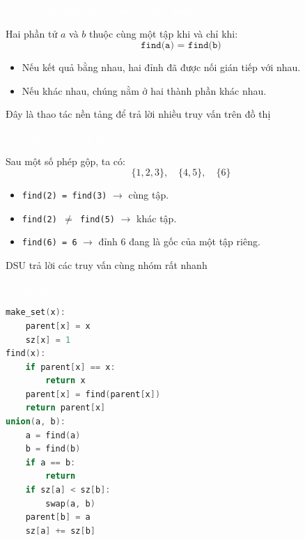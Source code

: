 \documentclass{beamer}
\newcommand{\hlgreen}[1]{\textcolor{mygreen}{#1}}
\newcommand{\hlred}[1]{\textcolor{myred}{#1}}
\newcommand{\hlpurple}[1]{\textcolor{mypurple}{#1}}
\newcommand{\hlorange}[1]{\textcolor{myorange}{#1}}
\newcommand{\hlwhite}[1]{\textcolor{white}{#1}}
\begin{document}

\begin{frame}{\hlwhite{Kiểm tra hai phần tử có cùng tập hay không}}
\begin{tcolorbox}[title=\textbf{\hlgreen{Quy tắc}}]
Hai phần tử \(a\) và \(b\) thuộc cùng một tập khi và chỉ khi:
\[
\texttt{find(a) = find(b)}
\]
\end{tcolorbox}

\begin{itemize}
  \item Nếu kết quả bằng nhau, hai đỉnh đã được nối gián tiếp với nhau.
  \item Nếu khác nhau, chúng nằm ở hai thành phần khác nhau.
\end{itemize}

\pause

\begin{tcolorbox}
\centering
\hlpurple{Đây là thao tác nền tảng để trả lời nhiều truy vấn trên đồ thị}
\end{tcolorbox}
\end{frame}


\begin{frame}{\hlwhite{Ví dụ kiểm tra cùng tập}}
\begin{tcolorbox}[title=\textbf{\hlgreen{Giả sử}}]
Sau một số phép gộp, ta có:
\[
\{1,2,3\},\quad \{4,5\},\quad \{6\}
\]
\end{tcolorbox}

\begin{itemize}
  \item \texttt{find(2) = find(3)} \(\rightarrow\) \hlgreen{cùng tập}.
  \item \texttt{find(2) \(\neq\) find(5)} \(\rightarrow\) \hlred{khác tập}.
  \item \texttt{find(6) = 6} \(\rightarrow\) đỉnh 6 đang là gốc của một tập riêng.
\end{itemize}

\pause

\begin{tcolorbox}
\centering
\hlorange{DSU trả lời các truy vấn cùng nhóm rất nhanh}
\end{tcolorbox}
\end{frame}


\begin{frame}[fragile]{\hlwhite{Mã giả DSU}}
\begin{lstlisting}[language=C++]
make_set(x):
    parent[x] = x
    sz[x] = 1
find(x):
    if parent[x] == x:
        return x
    parent[x] = find(parent[x])
    return parent[x]
union(a, b):
    a = find(a)
    b = find(b)
    if a == b:
        return
    if sz[a] < sz[b]:
        swap(a, b)
    parent[b] = a
    sz[a] += sz[b]
\end{lstlisting}
\end{frame}
\end{document}
